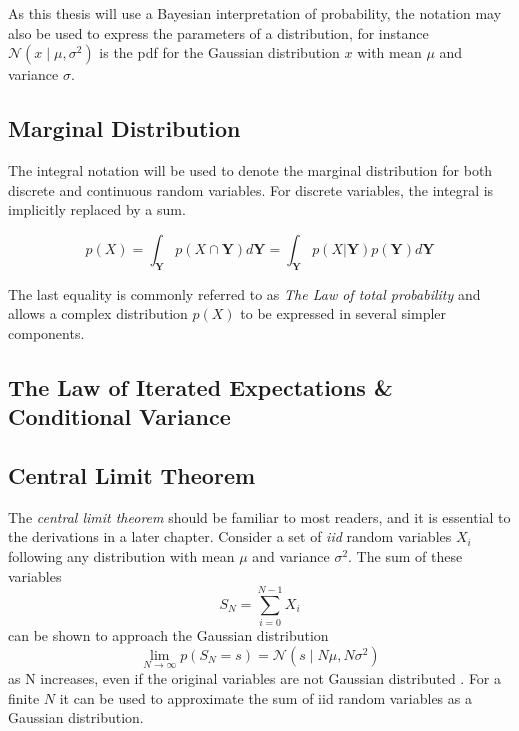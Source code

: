 As this thesis will use a Bayesian interpretation of probability, the notation may also be used to express the parameters of a distribution, for instance $\mathcal{N}(x \; | \;\mu, \sigma^2)$ is the \acrshort{pdf}  for the Gaussian distribution $x$ with mean $\mu$ and variance $\sigma$.

\subsection{Marginal Distribution}
The integral notation will be used to denote the marginal distribution for both discrete and continuous random variables. For discrete variables, the integral is implicitly replaced by a sum.  

\begin{equation}
    p(X) = \int_{\boldsymbol{Y}} p(X \cap \boldsymbol{Y}) d\boldsymbol{Y} = \int_{\boldsymbol{Y}} p(X | \boldsymbol{Y}) p(\boldsymbol{Y}) d\boldsymbol{Y}
\end{equation}

The last equality is commonly referred to as \textit{The Law of total probability} and allows a complex distribution $p(X)$ to be expressed in several simpler components.

\subsection{The Law of Iterated Expectations \& Conditional Variance}

\subsection{Central Limit Theorem}\label{sec:clt}
The \textit{central limit theorem} should be familiar to most readers, and it is essential to the derivations in a later chapter. Consider a set of \textit{\acrfull{iid}} random variables $X_i$ following any distribution with mean $\mu$ and variance $\sigma^2$. The sum of these variables 
\begin{equation}
    S_N = \sum_{i=0}^{N-1} X_i
\end{equation} 
can be shown to approach the Gaussian distribution
\begin{equation}
    \lim_{N \to \infty} p(S_N=s) = \mathcal{N}(s \; | \; N \mu, N\sigma^2)
\end{equation}
as N increases, even if the original variables are not Gaussian distributed \cite{murphy}. For a finite $N$ it can be used to approximate the sum of \acrshort{iid} random variables as a Gaussian distribution.

